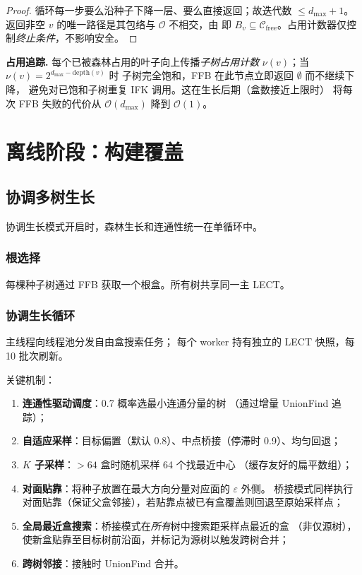 \documentclass[journal]{IEEEtran}
\newcommand{\Cfree}{\mathcal{C}_{\mathrm{free}}}
\newcommand{\calO}{\mathcal{O}}
\begin{document}
\begin{proof}
循环每一步要么沿种子下降一层、要么直接返回；故迭代数
$\leq d_{\max}+1$。返回非空 $v$ 的唯一路径是其包络与
$\calO$ 不相交，由  即 $B_v\subseteq\Cfree$。占用计数器仅控制\emph{终止条件}，不影响安全。
\end{proof}

\textbf{占用追踪.}
每个已被森林占用的叶子向上传播\emph{子树占用计数}
$\nu(v)$；当 $\nu(v)=2^{d_{\max}-\mathrm{depth}(v)}$ 时
子树完全饱和，FFB 在此节点立即返回 $\emptyset$ 而不继续下降，
避免对已饱和子树重复 IFK 调用。这在生长后期（盒数接近上限时）
将每次 FFB 失败的代价从 $\mathcal{O}(d_{\max})$ 降到 $\mathcal{O}(1)$。

\section{离线阶段：构建覆盖}\label{sec:build}

\subsection{协调多树生长}

协调生长模式开启时，森林生长和连通性统一在单循环中。

\subsubsection{根选择}
每棵种子树通过 FFB 获取一个根盒。所有树共享同一主 LECT。

\subsubsection{协调生长循环}
主线程向线程池分发自由盒搜索任务；
每个 worker 持有独立的 LECT 快照，每 10 批次刷新。

关键机制：
\begin{enumerate}[nosep]
  \item \textbf{连通性驱动调度}：0.7 概率选最小连通分量的树
    （通过增量 UnionFind 追踪）；
  \item \textbf{自适应采样}：目标偏置（默认 0.8）、中点桥接（停滞时 0.9）、均匀回退；
  \item \textbf{$K$ 子采样}：$>64$ 盒时随机采样 64 个找最近中心
    （缓存友好的扁平数组）；
  \item \textbf{对面贴靠}：将种子放置在最大方向分量对应面的 $\varepsilon$ 外侧。
    桥接模式同样执行对面贴靠（保证父盒邻接），若贴靠点被已有盒覆盖则回退至原始采样点；
  \item \textbf{全局最近盒搜索}：桥接模式在\emph{所有}树中搜索距采样点最近的盒
    （非仅源树），使新盒贴靠至目标树前沿面，并标记为源树以触发跨树合并；
  \item \textbf{跨树邻接}：接触时 UnionFind 合并。
\end{enumerate}
\end{document}
